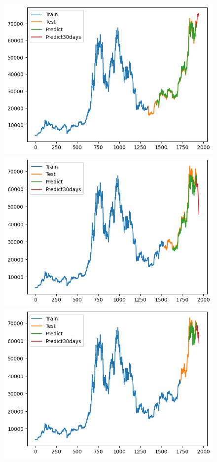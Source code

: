 \documentclass[conference]{IEEEtran}
\begin{document}
	\begin{figure}[H]
		\centering
		\begin{minipage}{0.15\textwidth}
			\centering
			\includegraphics[width=1\textwidth]{Figure/TimesNet_BTC_73.png}
		\end{minipage}
		\hfill
		\begin{minipage}{0.15\textwidth}
			\centering
			\includegraphics[width=1\textwidth]{Figure/TimesNet_BTC_82.png}
		\end{minipage}
		\hfill
		\begin{minipage}{0.15\textwidth}
			\centering
			\includegraphics[width=1\textwidth]{Figure/TimesNet_BTC_91.png}

\end{minipage}
\end{figure}
\end{document}
